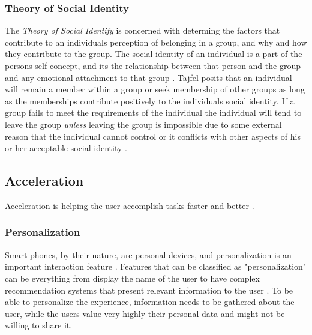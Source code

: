 \subsubsection{Theory of Social Identity}
The \textit{Theory of Social Identify} is concerned with determing the factors that contribute to an individuals perception of belonging in a group, and why and how they contribute to the group. The social identity of an individual is a part of the persons self-concept, and its the relationship between that person and the group and any emotional attachment to that group \cite{Tajfel1974}. Tajfel posits that an individual will remain a member within a group or seek membership of other groups as long as the memberships contribute positively to the individuals social identity. If a group fails to meet the requirements of the individual the individual will tend to leave the group \textit{unless} leaving the group is impossible due to some external reason that the individual cannot control or it conflicts with other aspects of his or her acceptable social identity \cite{Tajfel1974}.


\subsection{Acceleration}
Acceleration is helping the user accomplish tasks faster and better \cite{Bradt2009}.

\subsubsection{Personalization}
Smart-phones, by their nature, are personal devices, and personalization is an important interaction feature \cite{Karat2003}. Features that can be classified as "personalization" can be everything from display the name of the user to have complex recommendation systems that present relevant information to the user \cite{Kramer2000}. To be able to personalize the experience, information needs to be gathered about the user, while the users value very highly their personal data and might not be willing to share it\cite{Karat2003}.

